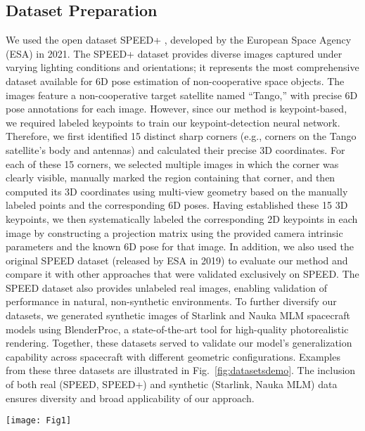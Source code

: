 \documentclass[a4paper,fleqn]{cas-sc}
\begin{document}
\subsection{Dataset Preparation}
We used the open dataset SPEED+ \citep{speed+}, developed by the European Space Agency (ESA) in 2021. The SPEED+ dataset provides diverse images captured under varying lighting conditions and orientations; it represents the most comprehensive dataset available for 6D pose estimation of non-cooperative space objects. The images feature a non-cooperative target satellite named “Tango,” with precise 6D pose annotations for each image. However, since our method is keypoint-based, we required labeled keypoints to train our keypoint-detection neural network. Therefore, we first identified 15 distinct sharp corners (e.g., corners on the Tango satellite’s body and antennas) and calculated their precise 3D coordinates. For each of these 15 corners, we selected multiple images in which the corner was clearly visible, manually marked the region containing that corner, and then computed its 3D coordinates using multi-view geometry based on the manually labeled points and the corresponding 6D poses. Having established these 15 3D keypoints, we then systematically labeled the corresponding 2D keypoints in each image by constructing a projection matrix using the provided camera intrinsic parameters and the known 6D pose for that image. In addition, we also used the original SPEED dataset (released by ESA in 2019) to evaluate our method and compare it with other approaches that were validated exclusively on SPEED. The SPEED dataset also provides unlabeled real images, enabling validation of performance in natural, non-synthetic environments.
To further diversify our datasets, we generated synthetic images of Starlink and Nauka MLM spacecraft models using BlenderProc, a state-of-the-art tool for high-quality photorealistic rendering. Together, these datasets served to validate our model’s generalization capability across spacecraft with different geometric configurations. Examples from these three datasets are illustrated in Fig.~\ref{fig:datasetsdemo}. The inclusion of both real (SPEED, SPEED+) and synthetic (Starlink, Nauka MLM) data ensures diversity and broad applicability of our approach.

\begin{figure*}[!htbp]
	\centering
	\texttt{[image: Fig1]} 
	\caption{Representative examples from the three datasets employed in this study: SPEED+, an open dataset provided by ESA, and Nauka MLM and Starlink, our synthetic datasets generated for comprehensive evaluation.}
	\label{fig:datasetsdemo}
\end{figure*}
\end{document}
